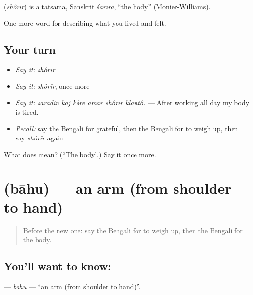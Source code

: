 \begin{cousinweb}
\textbf{} (\emph{shôrīr}) is a tatsama, Sanskrit \emph{śarīra}, \textquotedblleft{}the body\textquotedblright{} (Monier-Williams).
\end{cousinweb}

\begin{grammarlens}[title={What you've built}]
One more word for describing what you lived and felt.
\end{grammarlens}

\subsection*{Your turn}
\begin{itemize}
\raggedright
  \item \emph{Say it:} \emph{shôrīr}
  \item \emph{Say it:} \emph{shôrīr}, once more
  \item \emph{Say it:} \emph{sārādin kāj kôre āmār shôrīr klāntô.} — After working all day my body is tired.
  \item \emph{Recall:} say the Bengali for grateful, then the Bengali for to weigh up, then say \emph{shôrīr} again
\end{itemize}

\begin{tcolorbox}[breakable,colback=teal!4,colframe=teal!35!black,title={Before you move on}]
What does  mean? (\textquotedblleft{}The body\textquotedblright{}.) Say it once more.
\end{tcolorbox}
\section[\texorpdfstring{\bn{বাহু} (bāhu)}{বাহু (bāhu)}]{ (bāhu) — an arm (from shoulder to hand)}

\label{lesson:BN-C466-bahu}



\begin{quote}
Before the new one: say the Bengali for to weigh up, then the Bengali for the body.
\end{quote}

\subsection*{You'll want to know: }
\textbf{} — \emph{bāhu} — \textquotedblleft{}an arm (from shoulder to hand)\textquotedblright{}.

